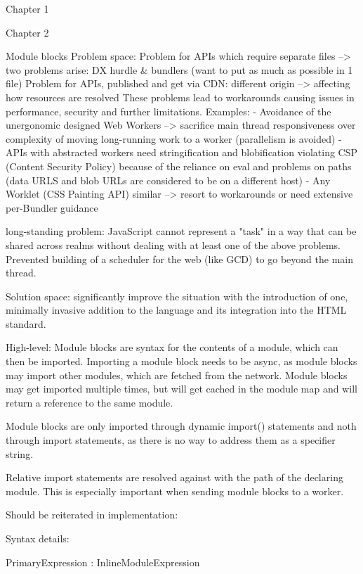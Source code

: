 Chapter 1

Chapter 2

Module blocks
Problem space:
Problem for APIs which require separate files --> two problems arise: DX hurdle \& bundlers (want to put as much as possible in 1 file)
Problem for APIs, published and get via CDN: different origin --> affecting how resources are resolved
These problems lead to workarounds causing issues in performance, security and further limitations.
Examples: - Avoidance of the unergonomic designed Web Workers --> sacrifice main thread responsiveness over complexity of moving long-running work to a worker (parallelism is avoided)
- APIs with abstracted workers need stringification and blobification violating CSP (Content Security Policy) because of the reliance on eval and problems on paths (data URLS and blob URLs are considered to be on a different host)
- Any Worklet (CSS Painting API) similar --> resort to workarounds or need extensive per-Bundler guidance

long-standing problem: JavaScript cannot represent a "task" in a way that can be shared across realms without dealing with at least one of the above problems. Prevented building of a scheduler for the web (like GCD) to go beyond the main thread.

Solution space: significantly improve the situation with the introduction of one, minimally invasive addition to the language and its integration into the HTML standard.

High-level:
Module blocks are syntax for the contents of a module, which can then be imported.
Importing a module block needs to be async, as module blocks may import other modules, which are fetched from the network. Module blocks may get imported multiple times, but will get cached in the module map and will return a reference to the same module.

Module blocks are only imported through dynamic import() statements and noth through import statements, as there is no way to address them as a specifier string.

Relative import statements are resolved against with the path of the declaring module. This is especially important when sending module blocks to a worker.

Should be reiterated in implementation:

Syntax details:

PrimaryExpression : InlineModuleExpression

